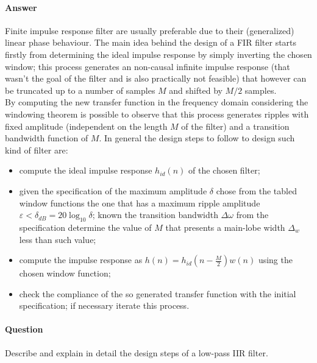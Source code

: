 	\paragraph{Answer} Finite impulse response filter are usually preferable due to their (generalized) linear phase behaviour. The main idea behind the design of a FIR filter starts firstly from determining the ideal impulse response by simply inverting the chosen window; this process generates an non-causal infinite impulse response (that wasn't the goal of the filter and is also practically not feasible) that however can be truncated up to a number of samples $M$ and shifted by $M/2$ samples. \\
	By computing the new transfer function in the frequency domain considering the windowing theorem is possible to observe that this process generates ripples with fixed amplitude (independent on the length $M$ of the filter) and a transition bandwidth function of $M$. In general the design steps to follow to design such kind of filter are:
	\begin{itemize}
		\item compute the ideal impulse response $h_{id}(n)$ of the chosen filter;
		\item given the specification of the maximum amplitude $\delta$ chose from the tabled window functions the one that has a maximum ripple amplitude $\varepsilon < \delta_{dB} = 20\log_{10}\delta$; known the transition bandwidth $\Delta \omega$ from the specification determine the value of $M$ that presents a main-lobe width $\Delta_w$ less than such value;
		
		\item compute the impulse response as $h(n) = h_{id} \left( n - \frac M2\right) w(n)$ using the chosen window function;
		
		\item check the compliance of the so generated transfer function with the initial specification; if necessary iterate this process.
	\end{itemize}
	
\newquestion
	\paragraph{Question} Describe and explain in detail the design steps of a low-pass IIR filter.
	
